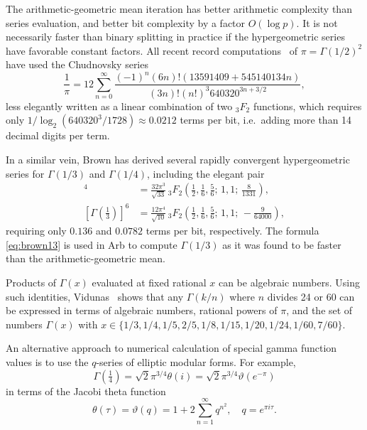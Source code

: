 \documentclass[reqno]{amsart}
\theoremstyle{definition}
\begin{document}
The arithmetic-geometric mean iteration has
better arithmetic complexity than series evaluation,
and better bit complexity by a factor $O(\log p)$.
It is not necessarily faster than
binary splitting in practice if the hypergeometric series
have favorable constant factors.
All recent record computations~\cite{Yee2021} of $\pi = \Gamma(1/2)^2$ have used
the Chudnovsky series~\cite{ChudnovskyChudnovsky1988}
\begin{equation}
\frac{1}{\pi} = 12 \sum_{n=0}^{\infty} \frac{(-1)^n (6n)! (13591409 + 545140134n)}{(3n)!(n!)^3 640320^{3n + 3/2}},
\end{equation}
less elegantly written as a linear combination of two ${}_3F_2$ functions,
which requires only $1 / \log_2(640320^3 / 1728) \approx 0.0212$ terms
per bit, i.e.\ adding more than 14 decimal digits per term.

In a similar vein, Brown \cite{brown2009algorithm} has derived
several rapidly convergent hypergeometric series for $\Gamma(1/3)$ and $\Gamma(1/4)$,
including the elegant pair
\begin{align}
[\Gamma(\tfrac{1}{4})]^4 &= \frac{32 \pi^3}{\sqrt{33}} \, {}_3F_2 \left(\tfrac{1}{2}, \tfrac{1}{6}, \tfrac{5}{6}; \, 1, 1; \, \tfrac{8}{1331}\right), \\
[\Gamma(\tfrac{1}{3})]^6 &= \frac{12 \pi^4}{\sqrt{10}} \, {}_3F_2 \left(\tfrac{1}{2}, \tfrac{1}{6}, \tfrac{5}{6}; \, 1, 1; \, -\tfrac{9}{64000}\right), \label{eq:brown13}
\end{align}
requiring only $0.136$ and $0.0782$ terms per bit, respectively.
The formula \eqref{eq:brown13} is used in Arb to compute $\Gamma(1/3)$
as it was found to be faster than the
arithmetic-geometric mean.

Products of $\Gamma(x)$ evaluated at fixed rational $x$ can be algebraic numbers.
Using such identities,
Vidunas~\cite{vidunas2005expressions} shows that
any $\Gamma(k/n)$ where $n$ divides 24 or 60 can be expressed
in terms of algebraic numbers, rational powers of $\pi$,
and the set of numbers $\Gamma(x)$ with $x \in \{1/3, 1/4, 1/5, 2/5, 1/8, 1/15, 1/20, 1/24, 1/60, 7/60\}$.

An alternative approach to numerical calculation
of special gamma function
values is to use the $q$-series of elliptic modular forms.
For example,
\begin{equation}
\Gamma(\tfrac{1}{4}) = \sqrt{2} \pi^{3/4} \theta(i) = \sqrt{2} \pi^{3/4} \vartheta(e^{-\pi})
\label{eq:g14theta}
\end{equation}
in terms of the Jacobi theta function
\begin{equation}
\theta(\tau) = \vartheta(q) = 1 + 2 \sum_{n=1}^{\infty} q^{n^2}, \quad q = e^{\pi i \tau}.
\end{equation}
\end{document}
